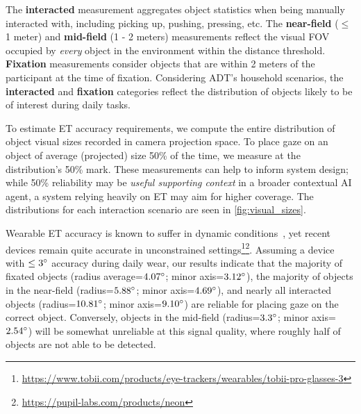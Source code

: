 The \textbf{interacted} measurement aggregates object statistics when being manually interacted with, including picking up, pushing, pressing, etc. The \textbf{near-field} ($\leq$ 1 meter) and \textbf{mid-field} (1 - 2 meters) measurements reflect the visual FOV occupied by \textit{every} object in the environment within the distance threshold.  \textbf{Fixation} measurements consider objects that are within 2 meters of the participant at the time of fixation.  Considering ADT's household scenarios, the \textbf{interacted} and \textbf{fixation} categories reflect the distribution of objects likely to be of interest during daily tasks.

To estimate ET accuracy requirements, we compute the entire distribution of object visual sizes recorded in camera projection space. To place gaze on an object of average (projected) size 50\% of the time, we measure at the distribution's 50\% mark.  These measurements can help to inform system design; while 50\% reliability may be \textit{useful supporting context} in a broader contextual AI agent, a system relying heavily on ET may aim for higher coverage.  The distributions for each interaction scenario are seen in \autoref{fig:visual_sizes}.

Wearable ET accuracy is known to suffer in dynamic conditions~\cite{onkhar_tobii_2023}, yet recent devices remain quite accurate in unconstrained settings\footnote{\url{https://www.tobii.com/products/eye-trackers/wearables/tobii-pro-glasses-3}}\footnote{\url{https://pupil-labs.com/products/neon}}.  Assuming a device with $\leq 3 \degree$ accuracy during daily wear, our results indicate that the majority of fixated objects (radius average=$4.07\degree$; minor axis=$3.12\degree$), the majority of objects in the near-field (radius=$5.88\degree$; minor axis=$4.69\degree$), and nearly all interacted objects (radius=$10.81\degree$; minor axis=$9.10\degree$) are reliable for placing gaze on the correct object.  Conversely, objects in the mid-field (radius=$3.3\degree$; minor axis=$2.54\degree$) will be somewhat unreliable at this signal quality, where roughly half of objects are not able to be detected.